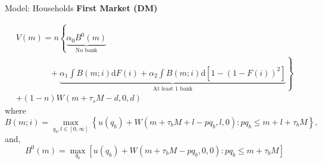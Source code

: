 \documentclass[10pt,english,slidetop,compress,
              blue,mathserif,color=option]{beamer}
\theoremstyle{plain}
\theoremstyle{definition}
\begin{document}
\begin{frame}[allowframebreaks]{Model: Households}
  \break
  \textbf{First Market (DM)}


  \begin{multline*}
  V\left(m\right)
  =
  n
  \left\{
     \underbrace{
       \alpha_{0}B^{0}\left(m\right)
     }_{\text{No bank}}
  \right.
  \\
  \left.
     \qquad\qquad
     +
     \underbrace{
        \alpha_{1}
        \int
        B\left(m;i\right)\text{d}F\left(i\right)
        +
      \alpha_{2}
      \int
      B\left(m;i\right)
      \text{d}\left[1-\left(1-F\left(i\right)\right)^{2}\right]
    }_{\text{At least 1 bank}}
  \right\}
  \\
  +(1-n)
  W\left(m + \tau_{s}M - d, 0, d\right)
  \label{eq:DM value}
  \end{multline*}
where
  \[
    B\left(m; i\right)
    =
    \max_{q_{b}, l \in [0,\infty]}
    \left\{
      u\left(q_{b}\right)+W\left(m+\tau_{b}M+l-pq_{b},l,0\right)
      :
      pq_{b}\leq m+l+\tau_{b}M
    \right\},
  \]
and,
  \[
    B^{0}\left(m\right)
    =
    \max_{q_{b}}\left[u\left(q_{b}\right)
    +W\left(m+\tau_{b}M-pq_{b},0,0\right): pq_{b}\leq m+\tau_{b}M\right]
  \]

\end{frame}
\end{document}
